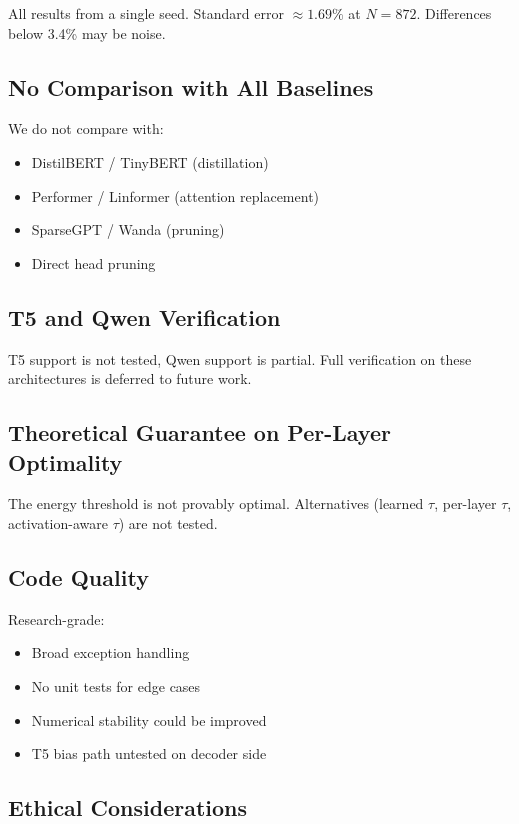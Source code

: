 All results from a single seed. Standard error $\approx 1.69\%$ at $N = 872$. 
Differences below 3.4\% may be noise.

\subsection{No Comparison with All Baselines}

We do not compare with:
\begin{itemize}
\item DistilBERT / TinyBERT (distillation)
\item Performer / Linformer (attention replacement)
\item SparseGPT / Wanda (pruning)
\item Direct head pruning

\end{itemize}
\subsection{T5 and Qwen Verification}

T5 support is not tested, Qwen support is partial. Full 
verification on these architectures is deferred to future work.

\subsection{Theoretical Guarantee on Per-Layer Optimality}

The energy threshold is not provably optimal. Alternatives (learned $\tau$, 
per-layer $\tau$, activation-aware $\tau$) are not tested.

\subsection{Code Quality}

Research-grade:
\begin{itemize}
\item Broad exception handling
\item No unit tests for edge cases
\item Numerical stability could be improved
\item T5 bias path untested on decoder side

\end{itemize}
\subsection{Ethical Considerations}

